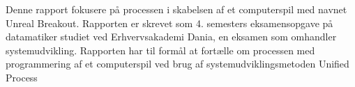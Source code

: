 Denne rapport fokusere på processen i skabelsen af et computerspil med navnet Unreal Breakout. Rapporten er skrevet som 4. semesters eksamensopgave på datamatiker studiet ved Erhvervsakademi Dania, en eksamen som omhandler systemudvikling. Rapporten har til formål at fortælle om processen med programmering af et computerspil ved brug af systemudviklingsmetoden Unified Process 